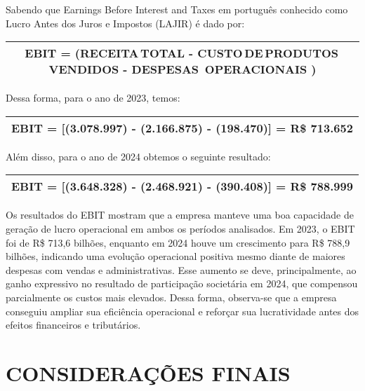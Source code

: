 \documentclass[1pt,a4paper]{article}
\begin{document}
	\hspace*{1.5cm} Sabendo que Earnings Before Interest and Taxes em português conhecido como Lucro Antes dos Juros e Impostos (LAJIR) é dado por:
	
	\begin{center}
		\begin{tabular}{|c|}
			\hline
			EBIT = (RECEITA\,TOTAL - CUSTO\,DE\,PRODUTOS\,VENDIDOS - DESPESAS \,OPERACIONAIS )\\
			\hline
		\end{tabular}
	\end{center}
	Dessa forma, para o ano de 2023, temos:
		
	\begin{center}
		\begin{tabular}{|c|}
			\hline
			EBIT = [(3.078.997) - (2.166.875) - (198.470)] =  R\$ 713.652 \\
			\hline
		\end{tabular}
	\end{center}
	Além disso, para o ano de 2024 obtemos o seguinte resultado:
		
	\begin{center}
		\begin{tabular}{|c|}
			\hline
			EBIT = [(3.648.328) - (2.468.921) - (390.408)] =  R\$ 788.999 \\
			\hline
		\end{tabular}
	\end{center}
	
	Os resultados do EBIT mostram que a empresa manteve uma boa capacidade de geração de lucro operacional em ambos os períodos analisados. Em 2023, o EBIT foi de R\$ 713,6 bilhões, enquanto em 2024 houve um crescimento para R\$ 788,9 bilhões, indicando uma evolução operacional positiva mesmo diante de maiores despesas com vendas e administrativas. Esse aumento se deve, principalmente, ao ganho expressivo no resultado de participação societária em 2024, que compensou parcialmente os custos mais elevados. Dessa forma, observa-se que a empresa conseguiu ampliar sua eficiência operacional e reforçar sua lucratividade antes dos efeitos financeiros e tributários.
	
	
	\section{CONSIDERAÇÕES FINAIS}
	
	\newpage
	
\end{document}
